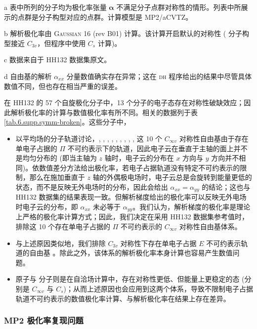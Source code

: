 \begin{table}[!t]
{\begin{tabular}{lld{4.4}d{2.3}d{2.3}d{2.3}d{2.3}d{2.3}}
    \bottomrule
    \end{tabular}
}{
    \item[a] 表中所列的分子均为极化率张量 $\bm{\alpha}$ 不满足分子点群对称性的情形。列表中所展示的点群是分子构型对应的点群。计算模型是 MP2/aCVTZ。
    \item[b] 解析极化率由 \textsc{Gaussian 16} (rev B01)\cite{Gaussian16} 计算。该计算开启默认的对称性 ( 分子构型接近 $C_{3v}$，但程序中使用 $C_s$ 计算)。
    \item[c] 数据来自于 HH132 数据集原文\cite{Hait-Head-Gordon.PCCP.2018}。
    \item[d]  自由基的解析 $\alpha_{xx}$ 分量数值确实存在异常；这在 \textsc{dh} 程序给出的结果中尽管具体数值不同，但也存在相当严重的误差。
}
\end{table}

在 HH132 的 57 个自旋极化分子中，13 个分子的电子态存在对称性破缺效应；因此解析极化率的计算与数值极化率有所不同。相关的数据列于表 \ref{tab.6.supp.symm-broken}。这些分子中，
\begin{itemize}[nosep]
    \item 以平均场的分子轨道讨论，, , , , , , , , ,  这 10 个 $C_{\infty v}$ 对称性自由基由于存在单电子占据的 $\Pi$ 不可约表示下的轨道，因此电子云在垂直于主轴的面上并不是均匀分布的 (即当主轴为 $z$ 轴时，电子云的分布在 $x$ 方向与 $y$ 方向并不相同)。依数值差分方法给出极化率，若电子占据轨道没有特定不可约表示的限制，那么在施加垂直于 $z$ 轴的外偶极电场时，电子云总是会旋转到能量更低的状态，而不是反映无外电场时的分布，因此会给出 $\alpha_{xx} = \alpha_{yy}$ 的结论；这也与 HH132 数据集的结果表现一致。但解析梯度给出的极化率可以反映无外电场时电子云的分布，即 $\alpha_{xx}$ 未必等于 $\alpha_{yy}$。我们认为，解析梯度的极化率是理论上严格的极化率计算方式；因此，我们决定在采用 HH132 数据集参考值时，排除这 10 个存在单电子占据的  $\Pi$ 不可约表示的 $C_{\infty v}$ 对称性自由基体系。
    \item 与上述原因类似地，我们排除 $C_{3v}$ 对称性下存在单电子占据 $E$ 不可约表示轨道的自由基 。除此之外，该体系的解析极化率本身计算也容易产生数值问题。
    \item {} 原子与  分子则是在自洽场计算中，存在对称性更低、但能量上更稳定的态 (分别是 $C_{\infty v}$ 与 $C_s$)；从而上述原因也会应用到这两个体系，导致不限制电子占据轨道不可约表示的数值极化率计算、与解析极化率在结果上存在差异。
\end{itemize}

\subsubsection{MP2 极化率复现问题}

